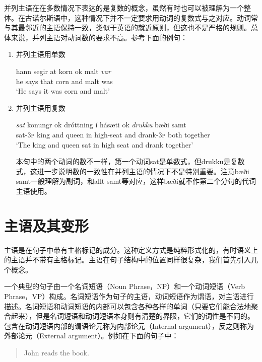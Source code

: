 \begin{enumerate}
并列主语在在多数情况下表达的是复数的概念，虽然有时也可以被理解为一个整体。在古诺尔斯语中，这种情况下并不一定要求用动词的复数式与之对应。动词常与其最邻近的主语保持一致，类似于英语的就近原则，但这也不是严格的规则。总体来说，并列主语对动词数的要求不高。参考下面的例句：
\begin{enumerate}
\setlength{\parindent}{2em}
    \item 并列主语用单数
    \begin{exe}
    \ex
    \gll hann	segir	at	korn	ok	malt	\textit{var}\\
he	says	that	corn	and	malt	was\\
\trans `He says it was corn and malt’
    \end{exe}

    \item 并列主语用复数
    \begin{exe}
    \ex
    \gll \textit{sat}	konungr	ok	dróttning	í	hásæti ok	\textit{drukku}	bæði	samt\\
sat-{\footnotesize 3}\textsc{p}	king	and	queen	in	high-seat and	drank-{\footnotesize 3}\textsc{p}	both	together\\		
\trans `The king and queen sat in high seat and drank together’
    \end{exe}
    本句中的两个动词的数不一样，第一个动词sat是单数式，但drukku是复数式，这进一步说明数的一致性在并列主语的情况下不是特别重要。注意bæði samt一般理解为副词，和allt samt等对应，这样bæði就不作第二个分句的代词主语使用。
\end{enumerate}


\end{enumerate}
\section{主语及其变形}
主语是在句子中带有主格标记的成分。这种定义方式是纯粹形式化的，有时语义上的主语并不带有主格标记。主语在句子结构中的位置同样很复杂，我们首先引入几个概念。

一个典型的句子由一个名词短语（Noun Phrase，NP）和一个动词短语（Verb Phrase，VP）构成。名词短语作为句子的主语，动词短语作为谓语，对主语进行描述。名词短语和动词短语的内部可以包含各种各样的单词（只要它们能合法地聚合起来），但是名词短语和动词短语本身则有清楚的界限，它们的词性是不同的。包含在动词短语内部的谓语论元称为内部论元（Internal argument），反之则称为外部论元（External argument）。例如在下面的句子中：
\begin{quote}
    John reads the book.
\end{quote}

